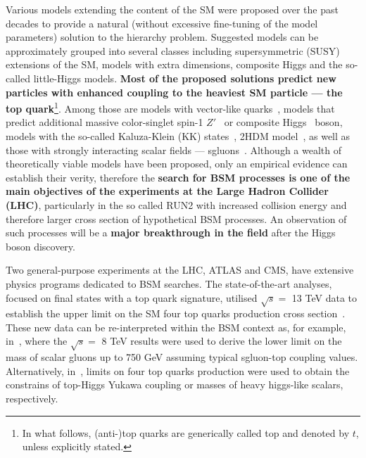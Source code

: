 \textcolor{\mycolor}{
Various models extending the content of the SM were proposed over the past decades to provide a natural (without excessive fine-tuning of the model parameters) solution to the hierarchy problem. Suggested models can be approximately grouped into several classes including supersymmetric (SUSY) extensions of the SM, models with extra dimensions, composite Higgs and the so-called little-Higgs models. \textbf{Most of the proposed solutions predict new particles with enhanced coupling to the heaviest SM particle --- the top quark}\footnote{In what follows, (anti-)top quarks are generically called top and denoted by $t$, unless explicitly stated.}. Among those are models with vector-like quarks~\cite{Aguilar-Saavedra:2013qpa}, models that predict additional massive color-singlet spin-1 $Z'$~\cite{Langacker:2008yv} or composite Higgs~\cite{Agashe:2004rs} boson, models with the so-called Kaluza-Klein (KK) states~\cite{Agashe:2006hk,Davoudiasl:1999jd}, 2HDM model~\cite{Dicus:1994bm,Craig:2015jba,Craig:2016ygr}, as well as those with strongly interacting scalar fields --- sgluons~\cite{Plehn:2008ae,GoncalvesNetto:2012nt}. Although a wealth of theoretically viable models have been proposed, only an empirical evidence can establish their verity, therefore the \textbf{search for BSM processes is one of the main objectives of the experiments at the Large Hadron Collider (LHC)}, particularly in the so called RUN2 with increased collision energy and therefore larger cross section of hypothetical BSM processes. An observation of such processes will be a \textbf{major breakthrough in the field} after the Higgs boson discovery.}

\textcolor{\mycolor}{
Two general-purpose experiments at the LHC, ATLAS and CMS, have extensive physics programs dedicated to BSM searches. The state-of-the-art analyses, focused on final states with a top quark signature, utilised $\sqrt{s}=$ 13 TeV data to establish the upper limit on the SM four top quarks production cross section~\cite{Aaboud:2017faq,Sirunyan:2017roi,Sirunyan:2017tep}. These new data can be re-interpreted within the BSM context as, for example, in~\cite{Beck:2015cga}, where %
the $\sqrt{s}=$ 8 TeV results were used to derive the lower limit on the mass of scalar gluons up to 750 GeV assuming typical sgluon-top coupling values. Alternatively, in~\cite{Cao:2016wib,Sirunyan:2017tep}, limits on four top quarks production were used to obtain the constrains of top-Higgs Yukawa coupling or masses of heavy higgs-like scalars, respectively.}

